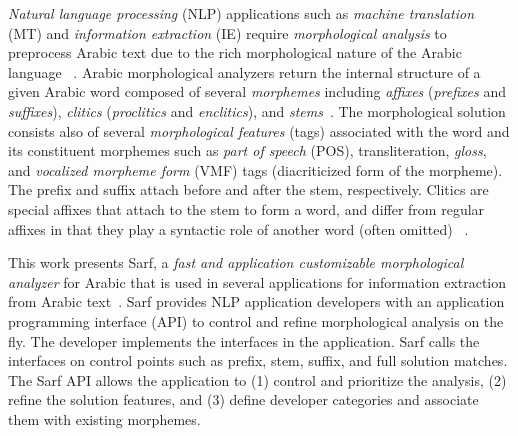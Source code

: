 {\em Natural language processing} (NLP) applications such as 
{\em machine translation} (MT) and {\em information extraction} (IE)
require {\em morphological analysis} to preprocess Arabic text
due to the rich morphological nature of the Arabic language
~\citep*{Benajiba:07,Habash:06}. 
%
Arabic morphological analyzers
return the internal structure of a given Arabic word composed of 
several {\em morphemes} including {\em affixes} ({\em prefixes} 
and {\em suffixes}), {\em clitics} ({\em proclitics} and {\em enclitics}), 
and {\em stems}~\citep*{Sughaiyer:04}. 
The morphological solution consists also of several {\em morphological features}
(tags) associated with the word and its constituent morphemes 
such as {\em part of speech} (POS), transliteration, {\em gloss}, 
and {\em vocalized morpheme form} (VMF) tags (diacriticized form of the morpheme).
%
The prefix and suffix attach before and after the stem, respectively. 
Clitics are special affixes that attach to the stem to form a word, 
and differ from regular affixes in that 
they play a syntactic role of another word (often omitted) 
~\citep*{habash2010introduction}. 
%

This work presents Sarf, a  {\em fast and application 
customizable morphological analyzer} for Arabic
that is used in several applications for information extraction 
from Arabic text~\citep*{JaZaMatar,ZaMaFlairs2012HadithBio,ZaMa2012IJCLATime,ZaMaHaCicling2012Entity}. 
Sarf provides NLP application developers with an application programming interface (API) 
to control and refine morphological analysis on the fly. 
The developer implements the interfaces in the application.
Sarf calls the interfaces 
on control points such as prefix, stem, suffix, and full solution matches.
The Sarf API allows the application to 
(1) control and prioritize the analysis, 
(2) refine the solution features, and
(3) define developer categories and associate them with existing morphemes.


